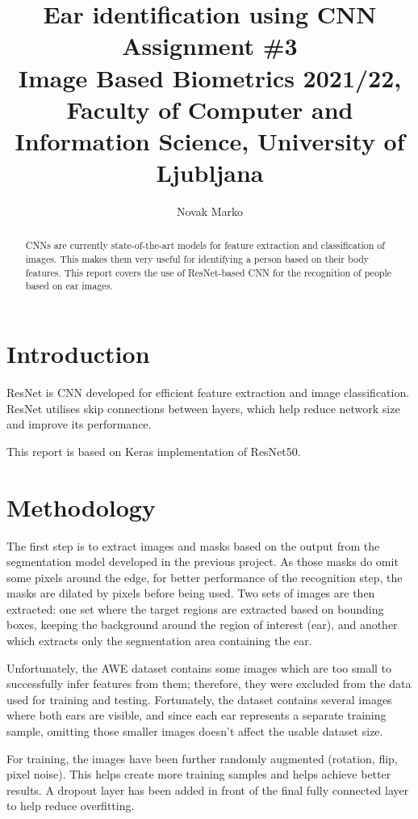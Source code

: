 \documentclass[9pt]{IEEEtran}
\title{\vspace{0ex} %
Ear identification using CNN
\\ \large{Assignment \#3}\\ \normalsize{Image Based Biometrics 2021/22, Faculty of Computer and Information Science, University of Ljubljana}}
\author{ %
Novak Marko
\vspace{-4.0ex}
}
\begin{document}
\maketitle

\begin{abstract}
    CNNs are currently state-of-the-art models for feature extraction and classification of images. This makes them very useful for identifying a person based on their body features. This report covers the use of ResNet-based CNN for the recognition of people based on ear images.
\end{abstract}

\section{Introduction}

ResNet is CNN developed for efficient feature extraction and image classification. ResNet utilises skip connections between layers, which help reduce network size and improve its performance.

This report is based on Keras implementation of ResNet50.

\section{Methodology}

The first step is to extract images and masks based on the output from the segmentation model developed in the previous project. As those masks do omit some pixels around the edge, for better performance of the recognition step, the masks are dilated by  pixels before being used. Two sets of images are then extracted: one set where the target regions are extracted based on bounding boxes, keeping the background around the region of interest (ear), and another which extracts only the segmentation area containing the ear.

Unfortunately, the AWE dataset contains some images which are too small to successfully infer features from them; therefore, they were excluded from the data used for training and testing. Fortunately, the dataset contains several images where both ears are visible, and since each ear represents a separate training sample, omitting those smaller images doesn't affect the usable dataset size.

For training, the images have been further randomly augmented (rotation, flip, pixel noise). This helps create more training samples and helps achieve better results. A dropout layer has been added in front of the final fully connected layer to help reduce overfitting.
\end{document}
